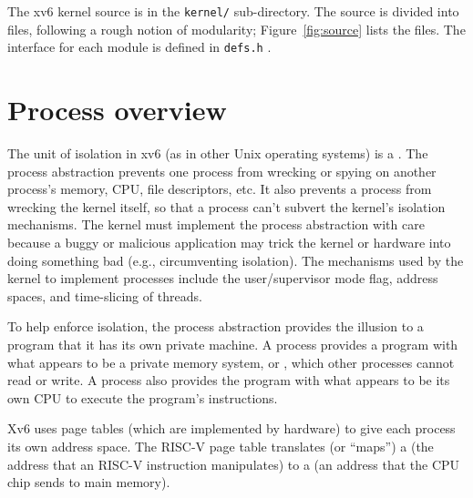 The xv6 kernel source is in the {\tt kernel/} sub-directory. The
source is divided into files, following a rough notion of modularity;
Figure~\ref{fig:source} lists the files.  The interface for each
module is defined in \lstinline{defs.h} .

\section{Process overview}

The unit of isolation in xv6 (as in other Unix operating systems) is a 
.
The process abstraction prevents one process from wrecking or spying on
another process's memory, CPU, file descriptors, etc.  It also prevents a process
from wrecking the kernel itself, so that a process can't subvert the kernel's
isolation mechanisms.
The kernel must implement the process abstraction with care because
a buggy or malicious application may trick the kernel or hardware into doing
something bad (e.g., circumventing isolation).  The mechanisms used by
the kernel to implement processes include the user/supervisor mode flag, address spaces,
and time-slicing of threads.

To help enforce isolation, the process abstraction provides the
illusion to a program that it has its own private machine.  A process provides
a program with what appears to be a private memory system, or
, 
which other processes cannot read or write.
A process also provides the program with what appears to be its own
CPU to execute the program's instructions.

Xv6 uses page tables (which are implemented by hardware) to give each process
its own address space. The RISC-V page table
translates (or ``maps'') a
(the address that an RISC-V instruction manipulates) to a
(an address that the CPU chip sends to main memory).

